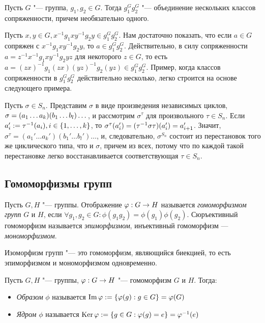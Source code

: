 \begin{exercise}
	Пусть $G$ "--- группа, $g_1, g_2 \in G$. Тогда $g_1^Gg_2^G$ "--- объединение нескольких классов сопряженности, причем необязательно одного.
\end{exercise}

\begin{solution}
	Пусть $x, y \in G, x^{-1}g_1xy^{-1}g_2y \in g_1^Gg_2^G$. Нам достаточно показать, что если $a \in G$ сопряжен с $x^{-1}g_1xy^{-1}g_2y$, то $a \in g_1^Gg_2^G$. Действительно, в силу сопряженности $a = z^{-1}x^{-1}g_1xy^{-1}g_2yz$ для некоторого $z \in G$, то есть $a = (zx)^{-1}g_1(zx)(yz)^{-1}g_2(yz) \in g_1^Gg_2^G$. Пример, когда классов сопряженности в $g_1^Gg_2^G$ действительно несколько, легко строится на основе следующего примера.
\end{solution}

\begin{example}
	Пусть $\sigma \in S_n$. Представим $\sigma$ в виде произведения независимых циклов, $\sigma \hm= (a_1\dotsc a_k)(b_1\dotsc b_l)\dotsc$, и рассмотрим $\sigma^\tau$ для произвольного $\tau \in S_n$. Если $a_i' := \tau^{-1}(a_i), i \hm\in \{1, \dots, k\}$, то $\sigma^\tau(a_i') \hm= (\tau^{-1}\sigma\tau)(a_i') = a_{i + 1}'$. Значит, $\sigma^\tau = (a_1'\dotsc a_k')(b_1'\dotsc b_l')\dotsc$, и, следовательно, $\sigma^{S_n}$ состоит из перестановок того же циклического типа, что и $\sigma$, причем из всех, потому что по каждой такой перестановке легко восстанавливается соответствующая $\tau \in S_n$.
\end{example}

\subsection{Гомоморфизмы групп}

\begin{definition}
	Пусть $G, H$ "--- группы. Отображение $\phi : G \hm\to H$ называется \textit{гомоморфизмом групп} $G$ и $H$, если $\forall g_1, g_2 \in G: \phi(g_1g_2) = \phi(g_1)\phi(g_2)$. Сюръективный гомоморфизм называется \textit{эпиморфизмом}, инъективный гомоморфизм --- \textit{мономорфизмом}.
\end{definition}

\begin{note}
	Изоморфизм групп "--- это гомоморфизм, являющийся биекцией, то есть эпиморфизмом и мономорфизмом одновременно.
\end{note}

\begin{definition}
	Пусть $G, H$ "--- группы, $\phi : G \hm\to H$ "--- гомоморфизм $G$ и $H$. Тогда:
	\begin{itemize}
		\item \textit{Образом} $\phi$ называется $\operatorname{Im}\varphi := \{\varphi(g): g \in G\} = \varphi(G)$
		\item \textit{Ядром} $\phi$ называется $\operatorname{Ker}\varphi := \{g \in G: \varphi(g) = e\} = \varphi^{-1}(e)$
	\end{itemize}
\end{definition}

